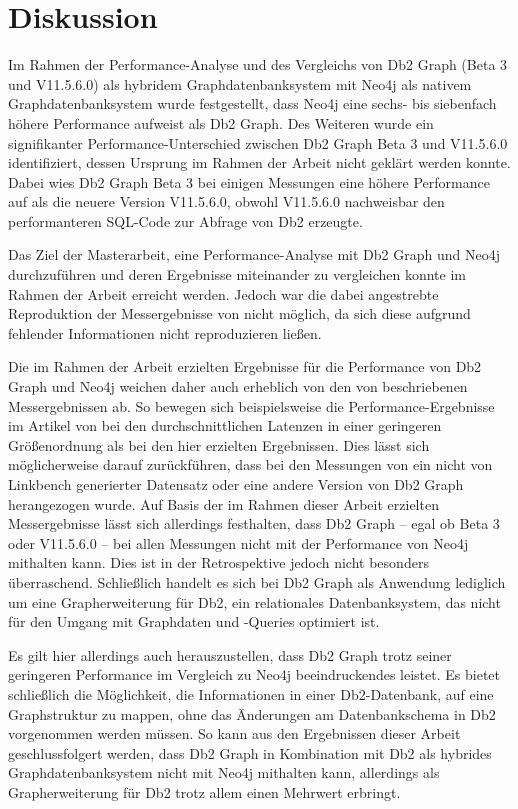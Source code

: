 \chapter{Diskussion}
\label{diskussion}
Im Rahmen der Performance-Analyse und des Vergleichs von Db2 Graph (Beta 3 und V11.5.6.0) als hybridem Graphdatenbanksystem mit Neo4j als nativem Graphdatenbanksystem wurde festgestellt, dass Neo4j eine sechs- bis siebenfach höhere Performance aufweist als Db2 Graph. Des Weiteren wurde ein signifikanter Performance-Unterschied zwischen Db2 Graph Beta 3 und V11.5.6.0 identifiziert, dessen Ursprung im Rahmen der Arbeit nicht geklärt werden konnte. Dabei wies Db2 Graph Beta 3 bei einigen Messungen eine höhere Performance auf als die neuere Version V11.5.6.0, obwohl V11.5.6.0 nachweisbar den performanteren SQL-Code zur Abfrage von Db2 erzeugte. 

Das Ziel der Masterarbeit, eine Performance-Analyse mit Db2 Graph und Neo4j durchzuführen und deren Ergebnisse miteinander zu vergleichen konnte im Rahmen der Arbeit erreicht werden. Jedoch war die dabei angestrebte Reproduktion der Messergebnisse von  nicht möglich, da sich diese aufgrund fehlender Informationen nicht reproduzieren ließen. 

Die im Rahmen der Arbeit erzielten Ergebnisse für die Performance von Db2 Graph und Neo4j weichen daher auch erheblich von den von  beschriebenen Messergebnissen ab. So bewegen sich beispielsweise die Performance-Ergebnisse im Artikel von  bei den durchschnittlichen Latenzen in einer geringeren Größenordnung als bei den hier erzielten Ergebnissen. Dies lässt sich möglicherweise darauf zurückführen, dass bei den Messungen von  ein nicht von Linkbench generierter Datensatz oder eine andere Version von Db2 Graph herangezogen wurde. Auf Basis der im Rahmen dieser Arbeit erzielten Messergebnisse lässt sich allerdings festhalten, dass Db2 Graph -- egal ob Beta 3 oder V11.5.6.0 -- bei allen Messungen nicht mit der Performance von Neo4j mithalten kann. Dies ist in der Retrospektive jedoch nicht besonders überraschend. Schließlich handelt es sich bei Db2 Graph als Anwendung lediglich um eine Grapherweiterung für Db2, ein relationales Datenbanksystem, das nicht für den Umgang mit Graphdaten und -Queries optimiert ist. 

Es gilt hier allerdings auch herauszustellen, dass Db2 Graph trotz seiner geringeren Performance im Vergleich zu Neo4j beeindruckendes leistet. Es bietet schließlich die Möglichkeit, die Informationen in einer Db2-Datenbank, auf eine Graphstruktur zu mappen, ohne das Änderungen am Datenbankschema in Db2 vorgenommen werden müssen. So kann aus den Ergebnissen dieser Arbeit geschlussfolgert werden, dass Db2 Graph in Kombination mit Db2 als hybrides Graphdatenbanksystem nicht mit Neo4j mithalten kann, allerdings als Grapherweiterung für Db2 trotz allem einen Mehrwert erbringt. 

